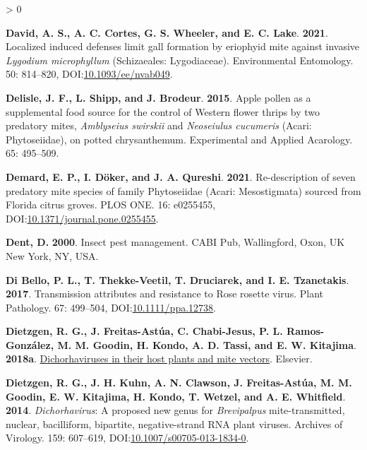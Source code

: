 \documentclass{ufdissertation}[overrideChapters] %
\newlength{\cslhangindent}
\newenvironment{CSLReferences}[2] %
 {%
  \setlength{\parindent}{0pt}
  \ifodd #1 \everypar{\setlength{\hangindent}{\cslhangindent}}\ignorespaces\fi
  \ifnum #2 > 0
  \setlength{\parskip}{#2\baselineskip}
  \fi
 }%
 {}
\begin{document}
{\begin{CSLReferences}{1}{1}
\leavevmode{}%
\textbf{David, A. S., A. C. Cortes, G. S. Wheeler, and E. C. Lake}. \textbf{2021}. Localized induced defenses limit gall formation by eriophyid mite against invasive {\emph{Lygodium microphyllum}} ({Schizaeales}: {Lygodiaceae}). Environmental Entomology. 50: 814--820, DOI:\href{https://doi.org/10.1093/ee/nvab049}{10.1093/ee/nvab049}.

\leavevmode{}%
\textbf{Delisle, J. F., L. Shipp, and J. Brodeur}. \textbf{2015}. Apple pollen as a supplemental food source for the control of {Western flower thrips} by two predatory mites, {\emph{Amblyseius swirskii}} and {\emph{Neoseiulus cucumeris}} {({Acari}: {Phytoseiidae})}, on potted chrysanthemum. Experimental and Applied Acarology. 65: 495--509.

\leavevmode{}%
\textbf{Demard, E. P., I. Döker, and J. A. Qureshi}. \textbf{2021}. Re-description of seven predatory mite species of family {Phytoseiidae} ({Acari}: {Mesostigmata}) sourced from {Florida} citrus groves. {PLOS} {ONE}. 16: e0255455, DOI:\href{https://doi.org/10.1371/journal.pone.0255455}{10.1371/journal.pone.0255455}.

\leavevmode{}%
\textbf{Dent, D.} \textbf{2000}. Insect pest management. CABI Pub, Wallingford, Oxon, UK New York, NY, USA.

\leavevmode{}%
\textbf{Di Bello, P. L., T. Thekke-Veetil, T. Druciarek, and I. E. Tzanetakis}. \textbf{2017}. Transmission attributes and resistance to {Rose rosette virus}. Plant Pathology. 67: 499--504, DOI:\href{https://doi.org/10.1111/ppa.12738}{10.1111/ppa.12738}.

\leavevmode{}%
\textbf{Dietzgen, R. G., J. Freitas-Astúa, C. Chabi-Jesus, P. L. Ramos-González, M. M. Goodin, H. Kondo, A. D. Tassi, and E. W. Kitajima}. \textbf{2018a}. \href{https://doi.org/10.1016/bs.aivir.2018.06.001}{Dichorhaviruses in their host plants and mite vectors}. Elsevier.

\leavevmode{}%
\textbf{Dietzgen, R. G., J. H. Kuhn, A. N. Clawson, J. Freitas-Astúa, M. M. Goodin, E. W. Kitajima, H. Kondo, T. Wetzel, and A. E. Whitfield}. \textbf{2014}. {\emph{Dichorhavirus}}: A proposed new genus for {\emph{Brevipalpus}} mite-transmitted, nuclear, bacilliform, bipartite, negative-strand {RNA} plant viruses. Archives of Virology. 159: 607--619, DOI:\href{https://doi.org/10.1007/s00705-013-1834-0}{10.1007/s00705-013-1834-0}.


\end{CSLReferences}}
\end{document}
